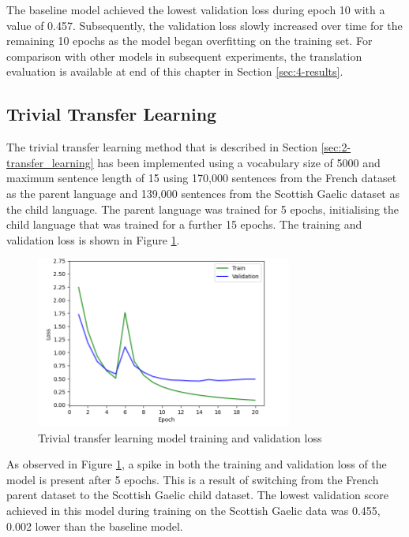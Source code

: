 The baseline model achieved the lowest validation loss during epoch 10 with a value of 0.457. Subsequently, the validation loss slowly increased over time for the remaining 10 epochs as the model began overfitting on the training set. For comparison with other models in subsequent experiments, the translation evaluation is available at end of this chapter in Section \ref{sec:4-results}.

\newpage
\subsection{Trivial Transfer Learning}
\label{sec:4-trivial}

The trivial transfer learning method that is described in Section \ref{sec:2-transfer_learning} has been implemented using a vocabulary size of 5000 and maximum sentence length of 15 using 170,000 sentences from the French dataset as the parent language and 139,000 sentences from the Scottish Gaelic dataset as the child language. The parent language was trained for 5 epochs, initialising the child language that was trained for a further 15 epochs. The training and validation loss is shown in Figure \ref{fig:loss_trivial}.

\begin{figure}[ht!]
\centering
\includegraphics[width=0.75\textwidth]{media/experiments/loss/5k/loss_trivial.png}
\captionsetup{justification=centering}
\caption[Trivial transfer learning model training and validation loss]{Trivial transfer learning model training and validation loss}
\label{fig:loss_trivial}
\end{figure}

As observed in Figure \ref{fig:loss_trivial}, a spike in both the training and validation loss of the model is present after 5 epochs. This is a result of switching from the French parent dataset to the Scottish Gaelic child dataset. The lowest validation score achieved in this model during training on the Scottish Gaelic data was 0.455, 0.002 lower than the baseline model.

